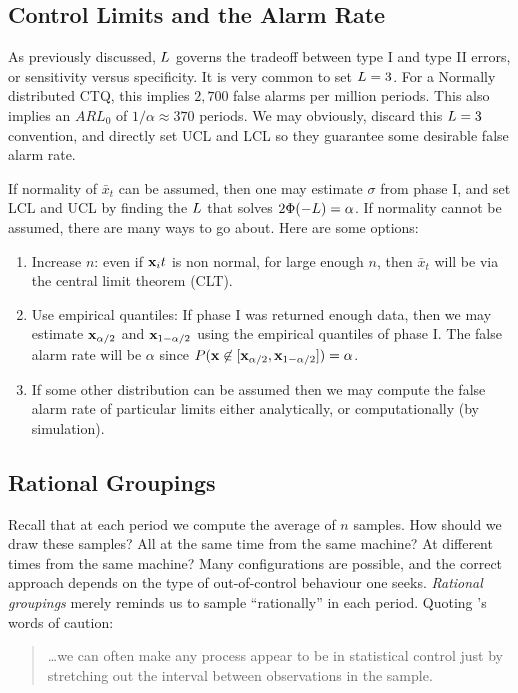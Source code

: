 \subsection{Control Limits and the Alarm Rate}
As previously discussed, $L$ governs the tradeoff between type I and type II errors, or sensitivity versus specificity.
It is very common to set $L=3$. 
For a Normally distributed CTQ, this implies $2,700$ false alarms per million periods. 
This also implies an $ARL_0$ of $1/\alpha \approx 370$ periods.
We may obviously, discard this $L=3$ convention, and directly set UCL and LCL so they guarantee some desirable false alarm rate. 

If normality of $\bar{x}_t$ can be assumed, then one may estimate $\sigma$ from phase I, and set LCL and UCL by finding the $L$ that solves $2\Phi(-L)=\alpha$.
If normality cannot be assumed, there are many ways to go about. Here are some options:
\begin{enumerate}
\item Increase $n$: even if $\mathbf{x}_it$ is non normal, for large enough $n$, then $\bar{x}_t$ will be via the central limit theorem (CLT).
\item Use empirical quantiles: If phase I was returned enough data, then we may estimate $\mathbf{x}_{\alpha/2}$ and $\mathbf{x}_{1-\alpha/2}$ using the empirical quantiles of phase I. The false alarm rate will be $\alpha$ since $P(\mathbf{x} \not \in [\mathbf{x}_{\alpha/2},\mathbf{x}_{1-\alpha/2}])=\alpha$.
\item If some other distribution can be assumed then we may compute the false alarm rate of particular limits either analytically, or computationally (by simulation).
\end{enumerate}




\subsection{Rational Groupings}
\label{sec:rational_grouping}
Recall that at each period we compute the average of $n$ samples. 
How should we draw these samples? All at the same time from the same machine?
At different times from the same machine?
Many configurations are possible, and the correct approach depends on the type of out-of-control behaviour one seeks. 
\emph{Rational groupings} merely reminds us to sample ``rationally'' in each period. 
Quoting \cite{montgomery_introduction_2007}'s words of caution:
\begin{quotation}
\dots we can often make any process appear to be in statistical control just by stretching out the interval between observations in the sample.
\end{quotation}






